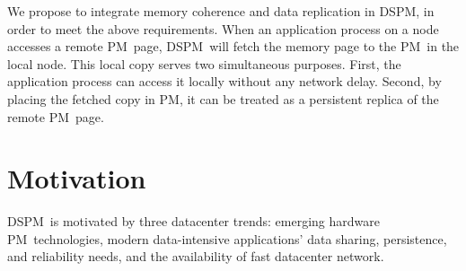 \documentclass[sigconf]{acmart}
\renewcommand{\em}{\it}
\newcommand{\dsnvm}{DSPM}
\newcommand{\nvm}{PM}
\providecommand{\DIFdelbegin}{} %
\providecommand{\DIFdelend}{} %
\begin{document}
We propose to integrate memory coherence and data replication in \dsnvm, 
in order to meet the above requirements.
When an application process on a node accesses a remote \nvm\ page,
\dsnvm\ will fetch the memory page to the \nvm\ in the local node. 
This local copy serves two simultaneous purposes.
First, the application process can access it locally without any network delay.
Second, by placing the fetched copy in \nvm, it can be treated as a persistent replica 
of the remote \nvm\ page.
\fi


\DIFdelbegin %
\DIFdelend \section{Motivation}
\label{sec:motivation}
\DIFdelbegin %
\DIFdelend 

\dsnvm\ is motivated by three datacenter trends: 
emerging hardware \nvm\ technologies, 
modern data-intensive applications' data sharing, persistence, and reliability needs, 
and the availability of fast datacenter network.
\end{document}
